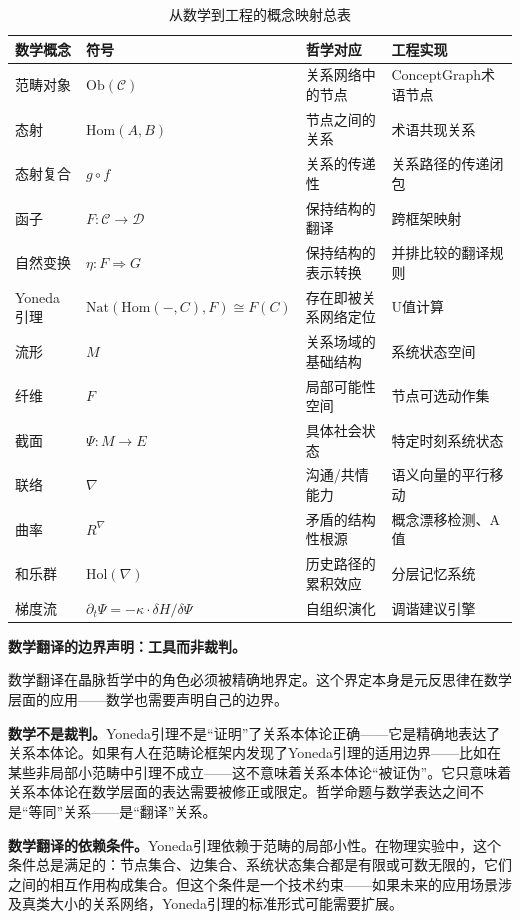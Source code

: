 \documentclass[11pt,a4paper]{book}
\theoremstyle{definition}
\begin{document}
\begin{table}[h]
\centering
\caption{从数学到工程的概念映射总表}
\begin{tabular}{@{}p{3cm}p{3.5cm}p{4cm}p{3.5cm}@{}}
\toprule
\textbf{数学概念} & \textbf{符号} & \textbf{哲学对应} & \textbf{工程实现} \\
\midrule
范畴对象 & $\text{Ob}(\mathcal{C})$ & 关系网络中的节点 & ConceptGraph术语节点 \\
态射 & $\text{Hom}(A,B)$ & 节点之间的关系 & 术语共现关系 \\
态射复合 & $g\circ f$ & 关系的传递性 & 关系路径的传递闭包 \\
函子 & $F: \mathcal{C}\to\mathcal{D}$ & 保持结构的翻译 & 跨框架映射 \\
自然变换 & $\eta: F\Rightarrow G$ & 保持结构的表示转换 & 并排比较的翻译规则 \\
Yoneda引理 & $\text{Nat}(\text{Hom}(-,C),F)\cong F(C)$ & 存在即被关系网络定位 & U值计算 \\
流形 & $M$ & 关系场域的基础结构 & 系统状态空间 \\
纤维 & $F$ & 局部可能性空间 & 节点可选动作集 \\
截面 & $\Psi: M\to E$ & 具体社会状态 & 特定时刻系统状态 \\
联络 & $\nabla$ & 沟通/共情能力 & 语义向量的平行移动 \\
曲率 & $R^\nabla$ & 矛盾的结构性根源 & 概念漂移检测、A值 \\
和乐群 & $\text{Hol}(\nabla)$ & 历史路径的累积效应 & 分层记忆系统 \\
梯度流 & $\partial_t\Psi=-\kappa\cdot\delta H/\delta\Psi$ & 自组织演化 & 调谐建议引擎 \\
\bottomrule
\end{tabular}
\end{table}

\textbf{数学翻译的边界声明：工具而非裁判。}

数学翻译在晶脉哲学中的角色必须被精确地界定。这个界定本身是元反思律在数学层面的应用——数学也需要声明自己的边界。

\textbf{数学不是裁判。}Yoneda引理不是“证明”了关系本体论正确——它是精确地表达了关系本体论。如果有人在范畴论框架内发现了Yoneda引理的适用边界——比如在某些非局部小范畴中引理不成立——这不意味着关系本体论“被证伪”。它只意味着关系本体论在数学层面的表达需要被修正或限定。哲学命题与数学表达之间不是“等同”关系——是“翻译”关系。

\textbf{数学翻译的依赖条件。}Yoneda引理依赖于范畴的局部小性。在物理实验中，这个条件总是满足的：节点集合、边集合、系统状态集合都是有限或可数无限的，它们之间的相互作用构成集合。但这个条件是一个技术约束——如果未来的应用场景涉及真类大小的关系网络，Yoneda引理的标准形式可能需要扩展。
\end{document}
